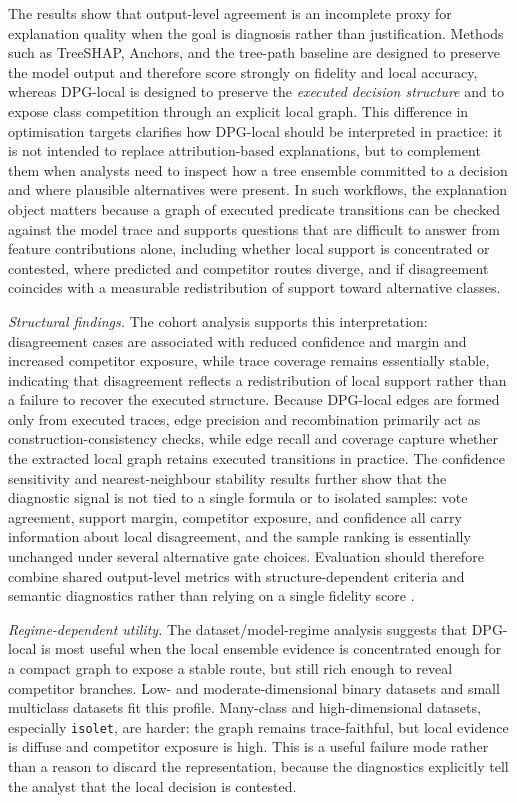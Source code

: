 \documentclass[runningheads]{llncs}
\begin{document}
The results show that output-level agreement is an incomplete proxy for explanation quality when the goal is diagnosis rather than justification. Methods such as TreeSHAP, Anchors, and the tree-path baseline are designed to preserve the model output and therefore score strongly on fidelity and local accuracy, whereas DPG-local is designed to preserve the \emph{executed decision structure} and to expose class competition through an explicit local graph. This difference in optimisation targets clarifies how DPG-local should be interpreted in practice: it is not intended to replace attribution-based explanations, but to complement them when analysts need to inspect how a tree ensemble committed to a decision and where plausible alternatives were present. In such workflows, the explanation object matters because a graph of executed predicate transitions can be checked against the model trace and supports questions that are difficult to answer from feature contributions alone, including whether local support is concentrated or contested, where predicted and competitor routes diverge, and if disagreement coincides with a measurable redistribution of support toward alternative classes.

\emph{Structural findings.} The cohort analysis supports this interpretation: disagreement cases are associated with reduced confidence and margin and increased competitor exposure, while trace coverage remains essentially stable, indicating that disagreement reflects a redistribution of local support rather than a failure to recover the executed structure. Because DPG-local edges are formed only from executed traces, edge precision and recombination primarily act as construction-consistency checks, while edge recall and coverage capture whether the extracted local graph retains executed transitions in practice. The confidence sensitivity and nearest-neighbour stability results further show that the diagnostic signal is not tied to a single formula or to isolated samples: vote agreement, support margin, competitor exposure, and confidence all carry information about local disagreement, and the sample ranking is essentially unchanged under several alternative gate choices. Evaluation should therefore combine shared output-level metrics with structure-dependent criteria and semantic diagnostics rather than relying on a single fidelity score \cite{nauta2023anecdotal,doshi2017rigorous}.

\emph{Regime-dependent utility.} The dataset/model-regime analysis suggests that DPG-local is most useful when the local ensemble evidence is concentrated enough for a compact graph to expose a stable route, but still rich enough to reveal competitor branches. Low- and moderate-dimensional binary datasets and small multiclass datasets fit this profile. Many-class and high-dimensional datasets, especially \texttt{isolet}, are harder: the graph remains trace-faithful, but local evidence is diffuse and competitor exposure is high. This is a useful failure mode rather than a reason to discard the representation, because the diagnostics explicitly tell the analyst that the local decision is contested.
\end{document}
